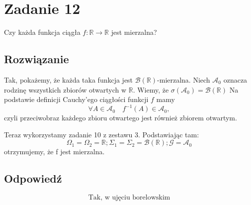 \section{Zadanie 12}
Czy każda funkcja ciągła \(f: \mathbb{R} \to \mathbb{R}\) jest mierzalna?

\subsection*{Rozwiązanie}
Tak, pokażemy, że każda taka funkcja jest \(\mathcal{B}(\mathbb{R})\)-mierzalna.
Niech \(\mathcal{A}_0\) oznacza rodzinę wszystkich zbiorów otwartych w \(\mathbb{R}\). Wiemy, że \(\sigma(\mathcal{A}_0) = \mathcal{B}(\mathbb{R})\)
Na podstawie definicji Cauchy'ego ciągłości funkcji \(f\) mamy
\[
	\forall A \in \mathcal{A}_0 \quad f^{-1}(A) \in \mathcal{A}_0,
\]
czyli przeciwobraz każdego zbioru otwartego jest również zbiorem otwartym.

Teraz wykorzystamy zadanie 10 z zestawu 3. Podstawiając tam:
\[
	\Omega _1 = \Omega _2 = \mathbb{R};  \Sigma _1 = \Sigma _2 = \mathcal{B}(\mathbb{R}) ; \mathcal{G} = \mathcal{A}_0
\]
otrzymujemy, że f jest mierzalna.

\subsection*{Odpowiedź}
\[
	\boxed{\text{Tak, w ujęciu borelowskim}}
\]
